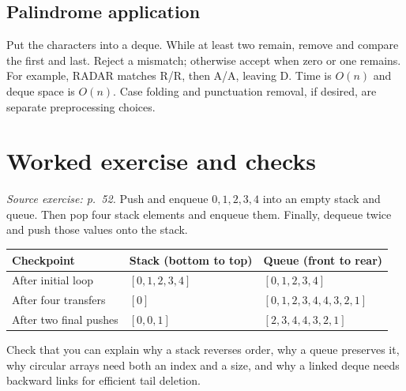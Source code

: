 \documentclass[11pt]{article}
\begin{document}
\subsection{Palindrome application}
Put the characters into a deque. While at least two remain, remove and compare the first and last. Reject a mismatch; otherwise accept when zero or one remains. For example, RADAR matches R/R, then A/A, leaving D. Time is $O(n)$ and deque space is $O(n)$. Case folding and punctuation removal, if desired, are separate preprocessing choices.

\section{Worked exercise and checks}
\textit{Source exercise: p.\ 52.}
Push and enqueue $0,1,2,3,4$ into an empty stack and queue. Then pop four stack elements and enqueue them. Finally, dequeue twice and push those values onto the stack.
\begin{center}
\begin{tabular}{lll}
\toprule
Checkpoint & Stack (bottom to top) & Queue (front to rear)\\
\midrule
After initial loop & $[0,1,2,3,4]$ & $[0,1,2,3,4]$\\
After four transfers & $[0]$ & $[0,1,2,3,4,4,3,2,1]$\\
After two final pushes & $[0,0,1]$ & $[2,3,4,4,3,2,1]$\\
\bottomrule
\end{tabular}
\end{center}
Check that you can explain why a stack reverses order, why a queue preserves it, why circular arrays need both an index and a size, and why a linked deque needs backward links for efficient tail deletion.
\end{document}
